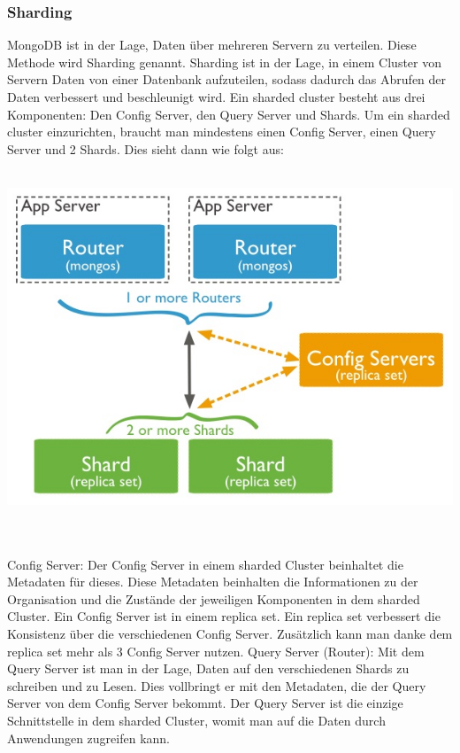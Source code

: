 \subsubsection{Sharding}
MongoDB ist in der Lage, Daten \"uber mehreren Servern zu verteilen. Diese Methode wird Sharding genannt. Sharding ist in der Lage, in einem Cluster von Servern Daten von einer Datenbank aufzuteilen, sodass dadurch das Abrufen der Daten verbessert und beschleunigt wird. Ein sharded cluster besteht aus drei Komponenten: Den Config Server, den Query Server und Shards. Um ein sharded cluster einzurichten, braucht man mindestens einen Config Server, einen Query Server und 2 Shards. Dies sieht dann wie folgt aus:
\\
\\
\begin{minipage}{\textwidth}
    \centering
    \includegraphics[scale=0.3]{images/01_sharded-cluster-production-architecture.jpg}
    \label{fig:ver}
\end{minipage}
\\
\\
Config Server: Der Config Server in einem sharded Cluster beinhaltet die Metadaten f\"ur dieses. Diese Metadaten beinhalten die Informationen zu der Organisation und die Zust\"ande der jeweiligen Komponenten in dem sharded Cluster.  Ein Config Server ist in einem replica set. Ein replica set verbessert die Konsistenz \"uber die verschiedenen Config Server. Zus\"atzlich kann man danke dem replica set mehr als 3 Config Server nutzen.
Query Server (Router): Mit dem Query Server ist man in der Lage, Daten auf den verschiedenen Shards zu schreiben und zu Lesen. Dies vollbringt er mit den Metadaten, die der Query Server von dem Config Server bekommt. Der Query Server ist die einzige Schnittstelle in dem sharded Cluster, womit man auf die Daten durch Anwendungen zugreifen kann. 
